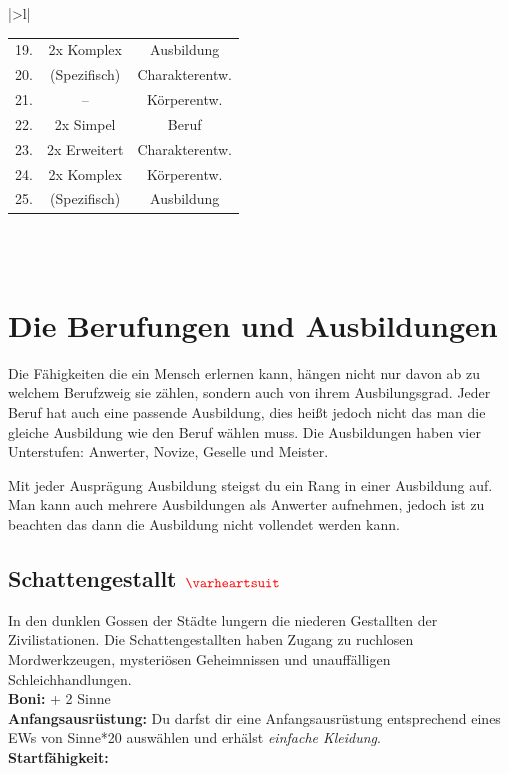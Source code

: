 \begin{table}[h!]
\begin{tabular}{|>{}l|}
\begin{tabular}{c|c|c}
            \rowcolor{myred} 19. & 2x Komplex & Ausbildung\\
            \rowcolor{myskin} 20. & (Spezifisch) & Charakterentw.\\
            \rowcolor{myred} 21. & -- & Körperentw.\\
            \rowcolor{myskin} 22. & 2x Simpel & Beruf\\
            \rowcolor{myred} 23. & 2x Erweitert & Charakterentw.\\
            \rowcolor{myskin} 24. & 2x Komplex & Körperentw.\\
            \rowcolor{myred} 25. & (Spezifisch) & Ausbildung \\
        \end{tabular}\\
        \\
        \btrule{1pt}
    \end{tabular}
\end{table}

\section*{Die Berufungen und Ausbildungen}
Die Fähigkeiten die ein Mensch erlernen kann, hängen nicht nur davon ab zu welchem Berufzweig sie zählen, sondern auch von ihrem Ausbilungsgrad.
Jeder Beruf hat auch eine passende Ausbildung, dies heißt jedoch nicht das man die gleiche Ausbildung wie den Beruf wählen muss. 
Die Ausbildungen haben vier Unterstufen: Anwerter, Novize, Geselle und Meister.

Mit jeder Ausprägung Ausbildung steigst du ein Rang in einer Ausbildung auf. Man kann auch mehrere Ausbildungen als Anwerter aufnehmen, jedoch ist zu beachten das dann die Ausbildung nicht vollendet werden kann.

\subsection*{Schattengestallt $\Herz{}$}
In den dunklen Gossen der Städte lungern die niederen Gestallten der Zivilistationen. Die Schattengestallten haben Zugang zu ruchlosen Mordwerkzeugen, mysteriösen Geheimnissen und unauffälligen Schleichhandlungen. \\
\textbf{Boni:} + 2 Sinne \\
\textbf{Anfangsausrüstung:} Du darfst dir eine Anfangsausrüstung entsprechend eines EWs von Sinne*20 auswählen und erhälst \textit{einfache Kleidung}.\\
\textbf{Startfähigkeit:}  \\

